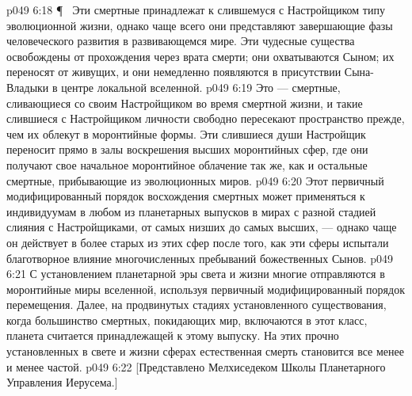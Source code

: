\vs p049 6:18 \P\ \bibnobreakspace {} Эти смертные принадлежат к слившемуся с Настройщиком типу эволюционной жизни, однако чаще всего они представляют завершающие фазы человеческого развития в развивающемся мире. Эти чудесные существа освобождены от прохождения через врата смерти; они охватываются Сыном; их переносят от живущих, и они немедленно появляются в присутствии Сына\hyp{}Владыки в центре локальной вселенной.
\vs p049 6:19 Это --- смертные, сливающиеся со своим Настройщиком во время смертной жизни, и такие слившиеся с Настройщиком личности свободно пересекают пространство прежде, чем их облекут в моронтийные формы. Эти слившиеся души Настройщик переносит прямо в залы воскрешения высших моронтийных сфер, где они получают свое начальное моронтийное облачение так же, как и остальные смертные, прибывающие из эволюционных миров.
\vs p049 6:20 Этот первичный модифицированный порядок восхождения смертных может применяться к индивидуумам в любом из планетарных выпусков в мирах с разной стадией слияния с Настройщиками, от самых низших до самых высших, --- однако чаще он действует в более старых из этих сфер после того, как эти сферы испытали благотворное влияние многочисленных пребываний божественных Сынов.
\vs p049 6:21 С установлением планетарной эры света и жизни многие отправляются в моронтийные миры вселенной, используя первичный модифицированный порядок перемещения. Далее, на продвинутых стадиях установленного существования, когда большинство смертных, покидающих мир, включаются в этот класс, планета считается принадлежащей к этому выпуску. На этих прочно установленных в свете и жизни сферах естественная смерть становится все менее и менее частой.
\vs p049 6:22 [Представлено Мелхиседеком Школы Планетарного Управления Иерусема.]
